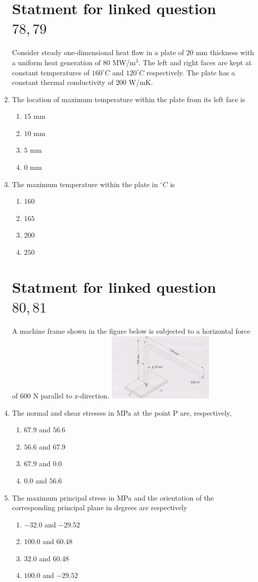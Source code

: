 \documentclass[journal,12pt,twocolumn]{IEEEtran}
\theoremstyle{remark}
\begin{document}
\begin{enumerate}[start=69]
\section{Statment for linked question $78 ,79$}
Consider steady one-dimensional heat flow in a plate of $20$ mm thickness with a uniform heat generation of $80$ MW/m$^3$. The left and right faces are kept at constant temperatures of $160^\circ C$ and $120^\circ C$ respectively. The plate has a constant thermal conductivity of $200$ W/mK. 

\item The location of maximum temperature within the plate from its left face is
\begin{enumerate}
    \item $15$ mm
    \item $10$ mm
    \item $5$ mm
    \item $0$ mm
\end{enumerate}
    \item The maximum temperature within the plate in $^\circ C$ is
    \begin{enumerate}
        \item $160$
        \item $165$
        \item $200$
        \item $250$
    \end{enumerate}
\section{Statment for linked question $80,81$}
A machine frame shown in the figure below is subjected to a horizontal force of 600 N parallel to z-direction.
\includegraphics[width=0.4\textwidth]{Screenshot 2024-10-23 180507.png}
\item The normal and shear stresses in MPa at the point P are, respectively,
\begin{enumerate}
    \item $67.9$ and $56.6$
    \item $56.6$ and $67.9$
    \item $67.9$ and $0.0$
    \item $0.0$ and $56.6$
\end{enumerate}
\item  The maximum principal stress in MPa and the orientation of the corresponding principal plane in degrees are respectively
    \begin{enumerate}
       \item  $-32.0$ and $-29.52 $
       \item  $100.0$ and $60.48 $
       \item  $32.0$ and $60.48$ 
       \item  $100.0$ and $-29.52$
    \end{enumerate}

\end{enumerate}
\end{document}

